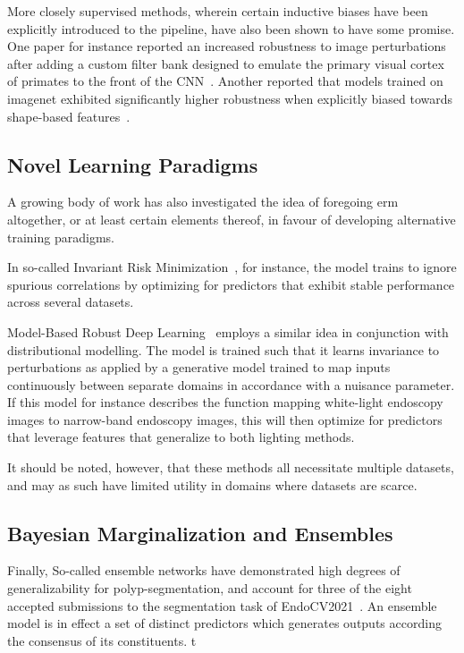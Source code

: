 More closely supervised methods, wherein certain inductive biases have been explicitly introduced to the pipeline, have also been shown to have some promise. One paper for instance reported an increased robustness to image perturbations after adding a custom filter bank designed to emulate the primary visual cortex of primates to the front of the CNN~\cite{visual_cortex}. Another reported that models trained on imagenet exhibited significantly higher robustness when explicitly biased towards shape-based features~\cite{texturebias}. 

\subsection{Novel Learning Paradigms}
A growing body of work has also investigated the idea of foregoing \gls{erm} altogether, or at least certain elements thereof, in favour of developing alternative training paradigms.

In so-called Invariant Risk Minimization~\cite{IRM}, for instance, the model trains to ignore spurious correlations by optimizing for predictors that exhibit stable performance across several datasets.

Model-Based Robust Deep Learning~\cite{modelbased} employs a similar idea in conjunction with distributional modelling. The model is trained such that it learns invariance to perturbations as applied by a generative model trained to map inputs continuously between separate domains in accordance with a nuisance parameter. If this model for instance describes the function mapping white-light endoscopy images to narrow-band endoscopy images, this will then optimize for predictors that leverage features that generalize to both lighting methods.

It should be noted, however, that these methods all necessitate multiple datasets, and may as such have limited utility in domains where datasets are scarce. 


\subsection{Bayesian Marginalization and Ensembles}\label{background:ensembles}
Finally, So-called ensemble networks have demonstrated high degrees of generalizability for polyp-segmentation, and account for three of the eight accepted submissions to the segmentation task of EndoCV2021~\cite{divergentnets,endoensemble, endocv2021_ensemble_3}. An ensemble model is in effect a set of distinct predictors which generates outputs according the consensus of its constituents. t

